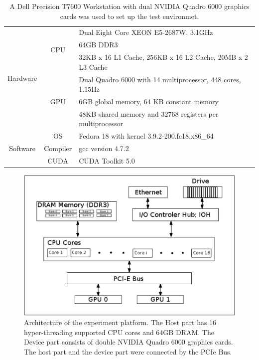 \documentclass[mathpazo]{cicp}
\theoremstyle{theoremlike}
\theoremstyle{definition}
\theoremstyle{remark}
\begin{document}
\begin{table}[htb]
\centering
\caption{
A Dell Precision T7600 Workstation with dual NVIDIA Quadro 6000 graphics 
cards was used to set up the test environmet.
\label{tab:Test-Environment}
}
\begin{tabular}{|c|c|p{9cm}|}
\hline \hline
\multirow{6}{*}{{\small Hardware}} & \multirow{3}{*}{{\small CPU}}
& {\small Dual Eight Core XEON E5-2687W, 3.1GHz}\\
&  & {\small 64GB DDR3}\\
&  & {\small 32KB x 16 L1 Cache, 256KB x 16 L2 Cache, 20MB x 2 L3 Cache}\\
\cline{2-3}
& \multirow{3}{*}{{\small GPU}}
& {\small Dual Quadro 6000 with 14 multiprocessor, 448 cores, 1.15Hz}\\
&  & {\small 6GB global memory, 64 KB constant memory}\\
&  & {\small 48KB shared memory and 32768 registers per multiprocessor}\\
\hline
\multirow{3}{*}{{\small Software}} & {\small OS}
& {\small Fedora 18 with kernel 3.9.2-200.fc18.x86\_64}\\
 & {\small Compiler} & {\small gcc version 4.7.2 }\\
 & {\small CUDA} & {\small CUDA Toolkit 5.0}\\
\hline \hline
\end{tabular}
\end{table}

\begin{figure}[htb]
\centering\includegraphics[scale=0.71]{fig_system_arch}
\caption{
\label{fig:system-arch}
Architecture of the experiment platform. The Host part has 16 
hyper-threading supported CPU cores and 64GB DRAM. The Device 
part consists of double NVIDIA Quadro 6000 graphics cards.
The host part and the device part were connected by the PCIe Bus.}
\end{figure}
\end{document}
